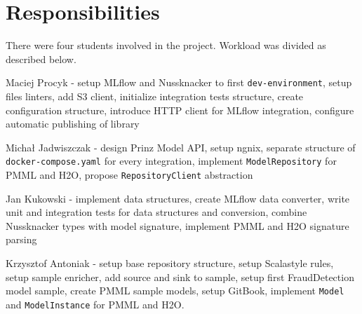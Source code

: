 \chapter{Responsibilities}
\label{chap:responsibilities}


There were four students involved in the project.
Workload was divided as described below.

Maciej Procyk - setup MLflow and Nussknacker to first \texttt{dev-environment}, setup files linters,
add S3 client, initialize integration tests structure, create configuration structure, introduce HTTP client for MLflow integration,
configure automatic publishing of library

Michał Jadwiszczak - design Prinz Model API, setup ngnix, separate structure of  \\ \texttt{docker-compose.yaml} for every integration,
implement \texttt{ModelRepository} for PMML and H2O, propose \texttt{RepositoryClient} abstraction

Jan Kukowski - implement data structures, create MLflow data converter, write unit and integration tests
for data structures and conversion, combine Nussknacker types with model signature, implement PMML and H2O signature parsing

Krzysztof Antoniak - setup base repository structure, setup Scalastyle rules, setup sample enricher, add source and sink to sample,
setup first FraudDetection model sample, create PMML sample models, setup GitBook, implement \texttt{Model} and \texttt{ModelInstance} for PMML and H2O.
